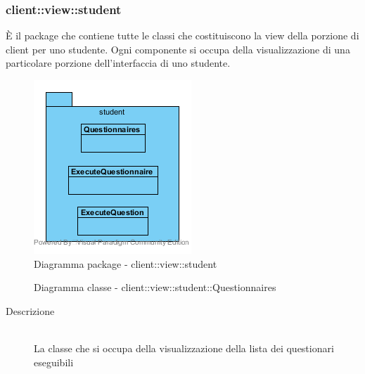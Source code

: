 \subsubsection{client::view::student}
È il package che contiene tutte le classi che costituiscono la view della porzione di client per uno studente. Ogni componente si occupa della visualizzazione di una particolare porzione dell'interfaccia di uno studente.\begin{center}
	\begin{figure}[H]
		\centering \includegraphics[scale=4, max width=\textwidth, max height=\myheight]{../img/diagrammiClassi/client/view/student.png}
		\caption{Diagramma package - client::view::student}
	\end{figure}
\end{center}\hypertarget{client::view::student::Questionnaires}{}
\begin{figure}[H]
	\centering
	\caption{Diagramma classe - client::view::student::Questionnaires}
\end{figure}\begin{description}
\item[Descrizione] \hfill \\
La classe che si occupa della visualizzazione della lista dei questionari eseguibili
\end{description}

